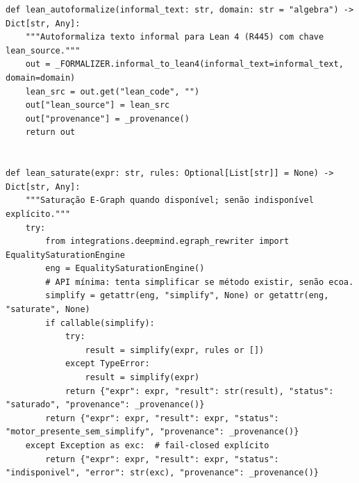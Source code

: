 \documentclass[12pt,openany,oneside,a4paper,brazil,chapter=TITLE]{abntex2}
\begin{document}
\begin{lstlisting}
def lean_autoformalize(informal_text: str, domain: str = "algebra") -> Dict[str, Any]:
    """Autoformaliza texto informal para Lean 4 (R445) com chave lean_source."""
    out = _FORMALIZER.informal_to_lean4(informal_text=informal_text, domain=domain)
    lean_src = out.get("lean_code", "")
    out["lean_source"] = lean_src
    out["provenance"] = _provenance()
    return out


def lean_saturate(expr: str, rules: Optional[List[str]] = None) -> Dict[str, Any]:
    """Saturação E-Graph quando disponível; senão indisponível explícito."""
    try:
        from integrations.deepmind.egraph_rewriter import EqualitySaturationEngine
        eng = EqualitySaturationEngine()
        # API mínima: tenta simplificar se método existir, senão ecoa.
        simplify = getattr(eng, "simplify", None) or getattr(eng, "saturate", None)
        if callable(simplify):
            try:
                result = simplify(expr, rules or [])
            except TypeError:
                result = simplify(expr)
            return {"expr": expr, "result": str(result), "status": "saturado", "provenance": _provenance()}
        return {"expr": expr, "result": expr, "status": "motor_presente_sem_simplify", "provenance": _provenance()}
    except Exception as exc:  # fail-closed explícito
        return {"expr": expr, "result": expr, "status": "indisponivel", "error": str(exc), "provenance": _provenance()}
\end{lstlisting}
\end{document}
